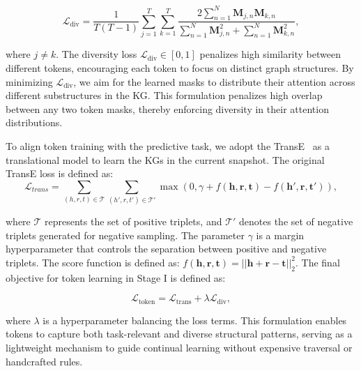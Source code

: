 \documentclass[runningheads]{llncs}
\begin{document}
\begin{equation}
    \mathcal{L}_{\text{div}} = \frac{1}{T(T - 1)} \sum_{j=1}^{T} \sum_{k=1}^{T}
    \frac{2 \sum_{n=1}^{N} \mathbf{M}_{j,n} \mathbf{M}_{k,n}}{\sum_{n=1}^{N} \mathbf{M}_{j,n}^2 + \sum_{n=1}^{N} \mathbf{M}_{k,n}^2},
\end{equation}

\noindent where $j \ne k$. The diversity loss $\mathcal{L}_{\text{div}} \in [0, 1]$ penalizes high similarity between different tokens, encouraging each token to focus on distinct graph structures. By minimizing $\mathcal{L}_{\text{div}}$, we aim for the learned masks to distribute their attention across different substructures in the KG. This formulation penalizes high overlap between any two token masks, thereby enforcing diversity in their attention distributions. 

To align token training with the predictive task, we adopt the TransE~\cite{bordes2013translating} as a translational model to learn the KGs in the current snapshot. The original TransE loss is defined as:
\begin{equation}
    \mathcal{L}_{trans} = \sum_{(h, r, t) \in \mathcal{T}} \sum_{(h', r, t') \in \mathcal{T'}} \max( 0,\gamma + f(\mathbf{h},\mathbf{r}, \mathbf{t})
    - f(\mathbf{h'}, \mathbf{r}, \mathbf{t'})),
    \label{margin_rank_loss}
\end{equation}

\noindent where $\mathcal{T}$ represents the set of positive triplets, and $\mathcal{T'}$ denotes the set of negative triplets generated for negative sampling. The parameter $\gamma$ is a margin hyperparameter that controls the separation between positive and negative triplets. The score function is defined as: $f(\mathbf{h},\mathbf{r},\mathbf{t}) = ||\mathbf{h}+\mathbf{r}-\mathbf{t}||_2^2$. 
The final objective for token learning in Stage I is defined as:

\begin{equation} \mathcal{L}_{\text{token}} = \mathcal{L}_{\text{trans}} + \lambda \mathcal{L}_{\text{div}}, 
\end{equation}


\noindent where $\lambda$ is a hyperparameter balancing the loss terms. This formulation enables tokens to capture both task-relevant and diverse structural patterns, serving as a lightweight mechanism to guide continual learning without expensive traversal or handcrafted rules.
\end{document}
